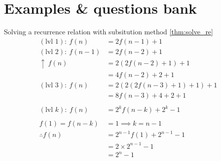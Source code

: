 \newpage

\section{Examples \& questions bank}

\begin{example}
    \label{eg:solve_re_1}
    Solving a recurrence relation with subsitution method \ref{thm:solve_re}
    \begin{align*}
        (\text{lvl }1):\ f(n)   & =2f(n-1)+1             \\
        (\text{lvl }2):\ f(n-1) & =2f(n-2)+1             \\
        \uparrow\ f(n)          & =2(2f(n-2)+1)+1        \\
                                & = 4f(n-2)+2+1          \\
        (\text{lvl }3):\ f(n)   & =2(2(2f(n-3)+1)+1)+1   \\
                                & = 8f(n-3)+4+2+1        \\
        \\
        (\text{lvl }k):\ f(n)   & =2^kf(n-k)+2^k-1       \\
        \\
        f(1) = f(n-k)           & =1 \implies k=n-1      \\
        \therefore f(n)         & =2^{n-1}f(1)+2^{n-1}-1 \\
                                & =2\times2^{n-1}-1      \\
                                & =2^n-1
    \end{align*}
\end{example}

